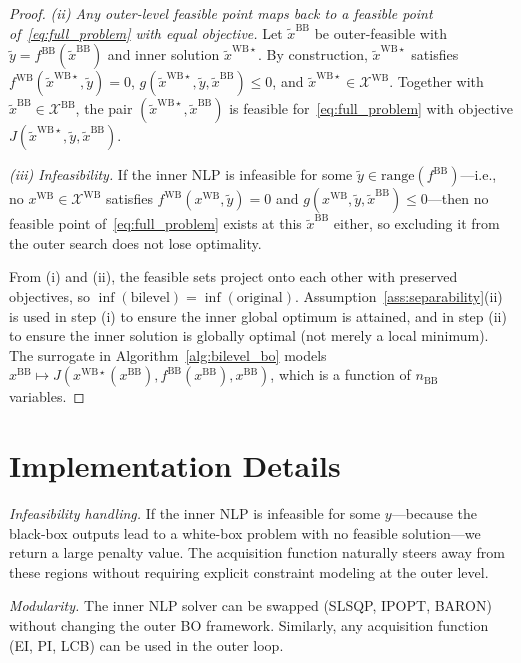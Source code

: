 \documentclass[12pt,a4paper]{article}%
\theoremstyle{plain}%
\theoremstyle{remark}%
\theoremstyle{definition}%
\def\WB{\mathrm{WB}}
\def\BB{\mathrm{BB}}
\begin{document}
\begin{appendices}
\begin{proof}
\emph{(ii) Any outer-level feasible point maps back to a feasible point of~\eqref{eq:full_problem} with equal objective.}
Let $\tilde{x}^{\BB}$ be outer-feasible with $\tilde{y} = f^{\BB}(\tilde{x}^{\BB})$ and inner solution $\tilde{x}^{\WB\star}$. By construction, $\tilde{x}^{\WB\star}$ satisfies $f^{\WB}(\tilde{x}^{\WB\star}, \tilde{y}) = 0$, $g(\tilde{x}^{\WB\star}, \tilde{y}, \tilde{x}^{\BB}) \leq 0$, and $\tilde{x}^{\WB\star} \in \mathcal{X}^{\WB}$. Together with $\tilde{x}^{\BB} \in \mathcal{X}^{\BB}$, the pair $(\tilde{x}^{\WB\star}, \tilde{x}^{\BB})$ is feasible for~\eqref{eq:full_problem} with objective $J(\tilde{x}^{\WB\star}, \tilde{y}, \tilde{x}^{\BB})$.

\emph{(iii) Infeasibility.}
If the inner NLP is infeasible for some $\tilde{y} \in \text{range}(f^{\BB})$---i.e., no $x^{\WB} \in \mathcal{X}^{\WB}$ satisfies $f^{\WB}(x^{\WB}, \tilde{y}) = 0$ and $g(x^{\WB}, \tilde{y}, \tilde{x}^{\BB}) \leq 0$---then no feasible point of~\eqref{eq:full_problem} exists at this $\tilde{x}^{\BB}$ either, so excluding it from the outer search does not lose optimality.

From (i) and (ii), the feasible sets project onto each other with preserved objectives, so $\inf(\text{bilevel}) = \inf(\text{original})$. Assumption~\ref{ass:separability}(ii) is used in step (i) to ensure the inner global optimum is attained, and in step (ii) to ensure the inner solution is globally optimal (not merely a local minimum). The surrogate in Algorithm~\ref{alg:bilevel_bo} models $x^{\BB} \mapsto J(x^{\WB\star}(x^{\BB}), f^{\BB}(x^{\BB}), x^{\BB})$, which is a function of $n_{\BB}$ variables.
\end{proof}

\section{Implementation Details}\label{sec:implementation_details}

\emph{Infeasibility handling.} If the inner NLP is infeasible for some $y$---because the black-box outputs lead to a white-box problem with no feasible solution---we return a large penalty value. The acquisition function naturally steers away from these regions without requiring explicit constraint modeling at the outer level.

\emph{Modularity.} The inner NLP solver can be swapped (SLSQP, IPOPT, BARON) without changing the outer BO framework. Similarly, any acquisition function (EI, PI, LCB) can be used in the outer loop.


\end{appendices}
\end{document}
